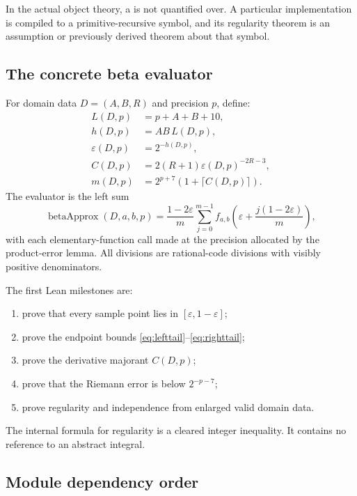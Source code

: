 In the actual object theory, a  is not quantified over.  A particular  implementation is compiled to a primitive-recursive symbol, and its regularity theorem is an assumption or previously derived theorem about that symbol.

\subsection{The concrete beta evaluator}

For domain data $D=(A,B,R)$ and precision $p$, define:
\begin{align*}
 L(D,p)&=p+A+B+10,\\
 h(D,p)&=AB\,L(D,p),\\
 \varepsilon(D,p)&=2^{-h(D,p)},\\
 C(D,p)&=2(R+1)\varepsilon(D,p)^{-2R-3},\\
 m(D,p)&=2^{p+7}(1+\lceil C(D,p)\rceil).
\end{align*}
The evaluator is the left sum
\[
 \operatorname{betaApprox}(D,a,b,p)
 =\frac{1-2\varepsilon}{m}
 \sum_{j=0}^{m-1}
 f_{a,b}\!\left(
 \varepsilon+\frac{j(1-2\varepsilon)}{m}\right),
\]
with each elementary-function call made at the precision allocated by the product-error lemma.  All divisions are rational-code divisions with visibly positive denominators.

The first Lean milestones are:

\begin{enumerate}
\item prove that every sample point lies in
$[\varepsilon,1-\varepsilon]$;
\item prove the endpoint bounds
\eqref{eq:lefttail}--\eqref{eq:righttail};
\item prove the derivative majorant $C(D,p)$;
\item prove that the Riemann error is below $2^{-p-7}$;
\item prove regularity and independence from enlarged valid domain data.
\end{enumerate}

The internal formula for regularity is a cleared integer inequality.  It contains no reference to an abstract integral.

\subsection{Module dependency order}

